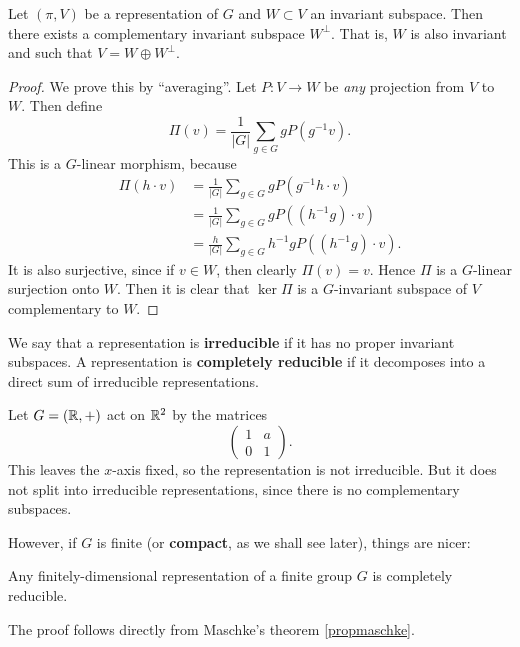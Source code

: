 \documentclass[11pt, english]{article}
\begin{document}
\begin{prop}
\label{propmaschke}
Let $(\pi,V)$ be a representation of $G$ and $W \subset V$ an invariant subspace. Then there exists a complementary invariant subspace $W^\perp$. That is, $W$ is also invariant and such that $V = W \oplus W^\perp$.
\end{prop}

\begin{proof}
  We prove this by ``averaging''. Let $P:V \to W$ be \emph{any} projection from $V$ to $W$. Then define 
\[
\Pi(v) = \frac 1{\lvert G \rvert} \sum_{g \in G} g P(g^{-1}v).
\]
This is a $G$-linear morphism, because
\begin{eqnarray*}
\Pi(h\cdot v) &= \frac 1{\lvert G \rvert} \sum_{g \in G} g P(g^{-1} h \cdot v) \\  
&=  \frac 1{\lvert G \rvert} \sum_{g \in G} g P((h^{-1}g) \cdot v) \\
&=  \frac h{\lvert G \rvert} \sum_{g \in G} h^{-1}g P((h^{-1}g) \cdot v).
\end{eqnarray*}
It is also surjective, since if $v \in W$, then clearly $\Pi(v)=v$. Hence $\Pi$ is a $G$-linear surjection onto $W$. Then it is clear that $\ker \Pi$ is a $G$-invariant subspace of $V$ complementary to $W$.
\end{proof}

We say that a representation is \textbf{irreducible} if it has no proper invariant subspaces. A representation is \textbf{completely reducible} if it decomposes into a direct sum of irreducible representations.

\begin{example}
  Let $G = (\mathbb{R},+)$ act on $\mathbb{R}^2$ by the matrices
\[
\begin{pmatrix}
1 & a \\ 
0 & 1
\end{pmatrix}.
\]
This leaves the $x$-axis fixed, so the representation is not irreducible. But it does not split into irreducible representations, since there is no complementary subspaces.
\end{example}

However, if $G$ is finite (or \textbf{compact}, as we shall see later), things are nicer:

\begin{thm}
 Any finitely-dimensional representation of a finite group $G$ is completely reducible.
\end{thm}
The proof follows directly from Maschke's theorem \eqref{propmaschke}.  
\end{document}
